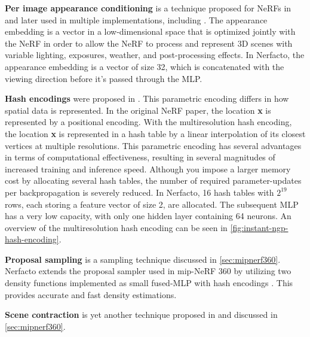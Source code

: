 \textbf{Per image appearance conditioning} is a technique proposed for NeRFs in \cite{martin-brualla_nerf_2021} and later used in multiple implementations, including \cite{tancik_block-nerf_2022}. The appearance embedding is a vector in a low-dimensional space that is optimized jointly with the NeRF in order to allow the NeRF to process and represent 3D scenes with variable lighting, exposures, weather, and post-processing effects. In Nerfacto, the appearance embedding is a vector of size 32, which is concatenated with the viewing direction before it's passed through the MLP.

\textbf{Hash encodings} were proposed in \cite{muller_instant_2022}. This parametric encoding differs in how spatial data is represented. In the original NeRF paper, the location \textbf{x} is represented by a positional encoding. With the multiresolution hash encoding, the location \textbf{x} is represented in a hash table by a linear interpolation of its closest vertices at multiple resolutions. This parametric encoding has several advantages in terms of computational effectiveness, resulting in several magnitudes of increased training and inference speed. Although you impose a larger memory cost by allocating several hash tables, the number of required parameter-updates per backpropagation is severely reduced. In Nerfacto, 16 hash tables with $2^{19}$ rows, each storing a feature vector of size 2, are allocated. The subsequent MLP has a very low capacity, with only one hidden layer containing 64 neurons. An overview of the multiresolution hash encoding can be seen in \autoref{fig:instant-ngp-hash-encoding}.



\textbf{Proposal sampling} is a sampling technique discussed in \autoref{sec:mipnerf360}. Nerfacto extends the proposal sampler used in mip-NeRF 360 by utilizing two density functions implemented as small fused-MLP with hash encodings \cite{muller_instant_2022}. This provides accurate and fast density estimations.

\textbf{Scene contraction} is yet another technique proposed in \cite{barronMipNeRF360Unbounded2022} and discussed in \autoref{sec:mipnerf360}.


